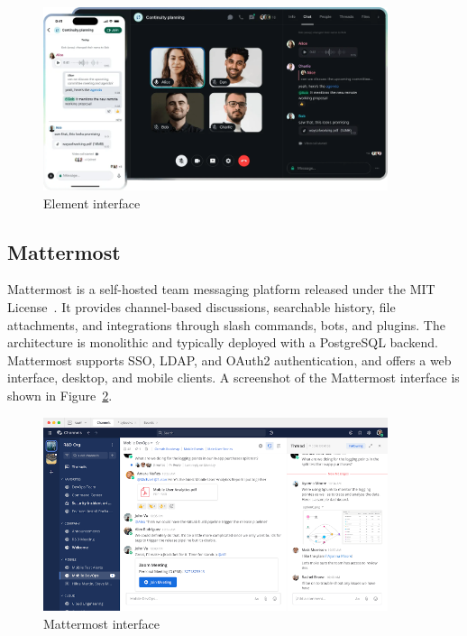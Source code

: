 \begin{figure}[H]
  \centering
  \includegraphics[width=0.9\textwidth]{imaxes/element-ui.png}
  \caption{Element interface}
  \label{fig:element-ui}
\end{figure}

\subsection{Mattermost}

Mattermost is a self-hosted team messaging platform released under the MIT License~\cite{mattermost-docs}. It provides channel-based discussions, searchable history, file attachments, and integrations through slash commands, bots, and plugins. The architecture is monolithic and typically deployed with a PostgreSQL backend. Mattermost supports SSO, LDAP, and OAuth2 authentication, and offers a web interface, desktop, and mobile clients. A screenshot of the Mattermost interface is shown in Figure~\ref{fig:mattermost-ui}.

\begin{figure}[H]
  \centering
  \includegraphics[width=0.9\textwidth]{imaxes/mattermost-ui.png}
  \caption{Mattermost interface}
  \label{fig:mattermost-ui}
\end{figure}

